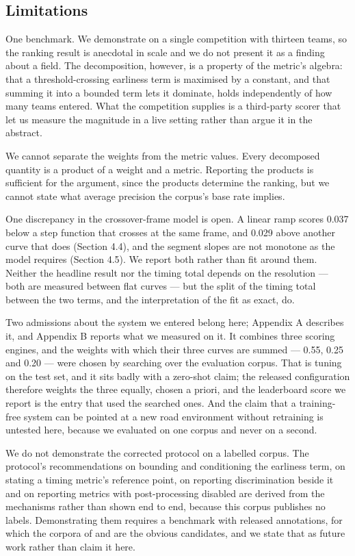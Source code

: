 \subsection{Limitations}

One benchmark. We demonstrate on a single competition with thirteen teams, so the ranking result is anecdotal in scale and we do not present it as a finding about a field. The decomposition, however, is a property of the metric's algebra: that a threshold-crossing earliness term is maximised by a constant, and that summing it into a bounded term lets it dominate, holds independently of how many teams entered. What the competition supplies is a third-party scorer that let us measure the magnitude in a live setting rather than argue it in the abstract.

We cannot separate the weights from the metric values. Every decomposed quantity is a product of a weight and a metric. Reporting the products is sufficient for the argument, since the products determine the ranking, but we cannot state what average precision the corpus's base rate implies.

One discrepancy in the crossover-frame model is open. A linear ramp scores 0.037 below a step function that crosses at the same frame, and 0.029 above another curve that does (Section 4.4), and the segment slopes are not monotone as the model requires (Section 4.5). We report both rather than fit around them. Neither the headline result nor the timing total depends on the resolution --- both are measured between flat curves --- but the split of the timing total between the two terms, and the interpretation of the fit as exact, do.

Two admissions about the system we entered belong here; Appendix A describes it, and Appendix B reports what we measured on it. It combines three scoring engines, and the weights with which their three curves are summed --- 0.55, 0.25 and 0.20 --- were chosen by searching over the evaluation corpus. That is tuning on the test set, and it sits badly with a zero-shot claim; the released configuration therefore weights the three equally, chosen a priori, and the leaderboard score we report is the entry that used the searched ones. And the claim that a training-free system can be pointed at a new road environment without retraining is untested here, because we evaluated on one corpus and never on a second.

We do not demonstrate the corrected protocol on a labelled corpus. The protocol's recommendations on bounding and conditioning the earliness term, on stating a timing metric's reference point, on reporting discrimination beside it and on reporting metrics with post-processing disabled are derived from the mechanisms rather than shown end to end, because this corpus publishes no labels. Demonstrating them requires a benchmark with released annotations, for which the corpora of \citet{chan2016dad} and \citet{bao2020ccd} are the obvious candidates, and we state that as future work rather than claim it here.

